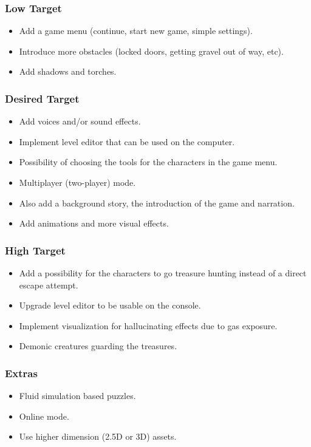 \subsubsection{Low Target}
\begin{itemize}
    \item Add a game menu (continue, start new game, simple settings). 
    \item Introduce more obstacles (locked doors, getting gravel out of way, etc).
    \item Add shadows and torches.
\end{itemize}

\subsubsection{Desired Target}
\begin{itemize}
    \item Add voices and/or sound effects.
    \item Implement level editor that can be used on the computer.
    \item Possibility of choosing the tools for the characters in the game menu.
    \item Multiplayer (two-player) mode.
    \item Also add a background story, the introduction of the game and narration. 
    \item Add animations and more visual effects.
\end{itemize}

\subsubsection{High Target}

\begin{itemize}
    \item Add a possibility for the characters to go treasure hunting instead of a direct escape attempt. 
    \item Upgrade level editor to be usable on the console.
    \item Implement visualization for hallucinating effects due to gas exposure. 
    \item Demonic creatures guarding the treasures.
\end{itemize}

\subsubsection{Extras}
\begin{itemize}
    \item Fluid simulation based puzzles.
    \item Online mode.
    \item Use higher dimension (2.5D or 3D) assets.
\end{itemize}
 
